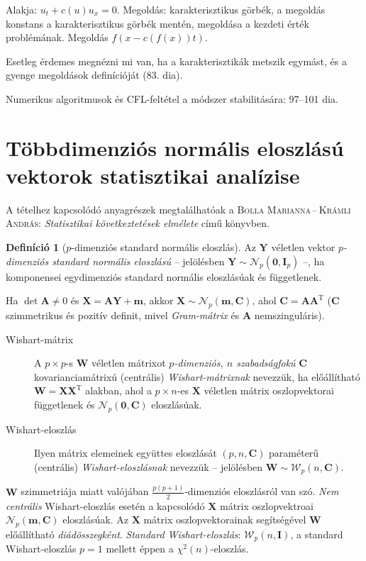 \documentclass[DIV=15,appendixprefix]{scrreprt}
\theoremstyle{definition}
\newtheorem*{defin}{Definíció}
\theoremstyle{remark}
\newcommand{\normald}{\mathcal{N}}
\newcommand{\wishartd}{\mathcal{W}}
\DeclareMathOperator{\T}{T}
\begin{document}
Alakja: $ u_t + c \left( u \right) u_x = 0 $. Megoldás: karakterisztikus görbék, a megoldás konstans
a karakterisztikus görbék mentén, megoldása a kezdeti érték problémának. Megoldás $ f \left( x - c \left( f \left( x \right) \right) t \right)$.

Esetleg érdemes megnézni mi van, ha a karakterisztikák metszik egymást, és a gyenge megoldások
definícióját (83. dia).

Numerikus algoritmusok és CFL-feltétel a módszer stabilitására: 97--101 dia.
%
\section{Többdimenziós normális eloszlású vektorok statisztikai analízise}
A tételhez kapcsolódó anyagrészek megtalálhatóak a \textsc{Bolla Marianna\,--\,Krámli András}:
\emph{Statisztikai következtetések elmélete} \cite{BollaKramli} című könyvben.

\begin{defin}[$ p $-dimenziós standard normális eloszlás] Az $ \mathbf{ Y } $ véletlen vektor
	\emph{$ p $-dimenziós standard normális eloszlású} -- jelölésben $ \mathbf{ Y } \sim
	\normald_{ p } \left( \mathbf{ 0 },{} \mathbf{ I }_{ p } \right) $ --, ha komponensei
	egydimenziós standard normális eloszlásúak és függetlenek.
\end{defin}
Ha $ \det \mathbf{ A } \neq 0 $ és $ \mathbf{ X } = \mathbf{ A } \mathbf{ Y } + \mathbf{ m } $,
akkor $ \mathbf{ X } \sim \normald_{ p } \left( \mathbf{ m },{} \mathbf{ C } \right) $, ahol
$ \mathbf{ C } = \mathbf{ A } \mathbf{ A }^{ \T } $ ($ \mathbf{ C } $ szimmetrikus és pozitív
definit, mivel \emph{Gram-mátrix} és $ \mathbf{ A } $ nemszinguláris).
%
\leavevmode
\begin{description}
	\item[Wishart-mátrix] A $ p \times  p $-s $ \mathbf{ W } $ véletlen mátrixot
		\emph{$ p $-dimenziós, $ n $ szabadságfokú} $ \mathbf{ C } $ kovarianciamátrixú (centrális)
		\emph{Wishart-mátrixnak} nevezzük, ha előállítható $ \mathbf{ W } = \mathbf{ X }
		\mathbf{ X }^{ \T } $ alakban, ahol a $ p \times n $-es $ \mathbf{ X } $ véletlen mátrix
		oszlopvektorai függetlenek és $ \normald_{ p } \left( \mathbf{ 0 },{} \mathbf{ C } \right) $
		eloszlásúak.
	\item[Wishart-eloszlás] Ilyen mátrix elemeinek együttes eloszlását $ \left( p,{} n,{}
		\mathbf{ C } \right) $ paraméterű (centrális) \emph{Wi\-shart-eloszlásnak} nevezzük --
		jelölésben $ \mathbf{ W } \sim \wishartd_{ p } \left( n,{} \mathbf{ C } \right) $.
\end{description}
$ \mathbf{ W } $ szimmetriája miatt valójában $ \frac{ p
\left( p + 1 \right) }{ 2 } $-dimenziós eloszlásról van szó. \emph{Nem centrális} Wishart-eloszlás
esetén a kapcsolódó $ \mathbf{ X } $ mátrix oszlopvektroai $ \normald_{ p } \left( \mathbf{ m },{}
\mathbf{ C } \right) $ eloszlásúak. Az $ \mathbf{ X } $ mátrix oszlopvektorainak segítségével
$ \mathbf{ W } $ előállítható \emph{diádösszegként}. \emph{Standard Wishart-eloszlás}:
$ \wishartd_{ p } \left( n,{} \mathbf{ I } \right) $, a standard Wishart-eloszlás $ p  = 1 $ mellett
éppen a $ \chi^{ 2 } \left( n \right) $-eloszlás.
\end{document}
